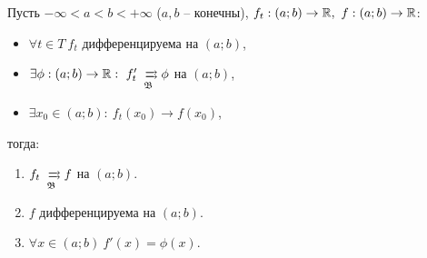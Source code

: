 

\begin{theorem}\label{theorem:6.9.5}
    Пусть $ -\infty < a < b < +\infty $ ($ a,b $ -- конечны), $ f_t: (a;b)\rightarrow\R, \ f:(a;b) \rightarrow \R $:
    \begin{itemize}
        \item $ \forall t \in T \ f_t $ дифференцируема на $ (a;b) $,
        \item $ \exists \phi: (a;b)\rightarrow\R: \ f_t' \xrightrightarrows[\mathfrak{B}]{} \phi $ на $ (a;b) $,
        \item $ \exists x_0 \in (a;b): \ f_t(x_0) \rightarrow f(x_0) $,
    \end{itemize}
    тогда:
    \begin{enumerate}
        \item $ f_t \xrightrightarrows[\mathfrak{B}]{} f $ на $ (a;b) $.
        \item $ f $ дифференцируема на $ (a;b) $.
        \item $ \forall x \in (a;b) \ f'(x) = \phi(x) $.
    \end{enumerate}
\end{theorem}

